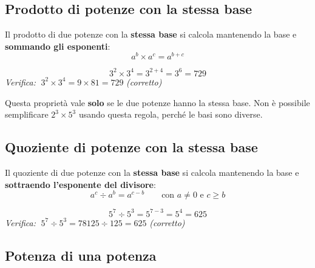 \subsection{Prodotto di potenze con la stessa base}

\begin{regola}
  Il prodotto di due potenze con la \textbf{stessa base} si calcola mantenendo
  la base e \textbf{sommando gli esponenti}:
  \[
    a^b \times a^c = a^{b+c}
  \]
\end{regola}

\begin{esempio}
  \[
    3^2 \times 3^4 = 3^{2+4} = 3^6 = 729
  \]
  \textit{Verifica:} $\;3^2 \times 3^4 = 9 \times 81 = 729$ \quad\textit{(corretto)}
\end{esempio}

\begin{attenzione}
  Questa proprietà vale \textbf{solo} se le due potenze hanno la stessa base.
  Non è possibile semplificare $2^3 \times 5^3$ usando questa regola,
  perché le basi sono diverse.
\end{attenzione}

\subsection{Quoziente di potenze con la stessa base}

\begin{regola}
  Il quoziente di due potenze con la \textbf{stessa base} si calcola mantenendo
  la base e \textbf{sottraendo l'esponente del divisore}:
  \[
    a^c \div a^b = a^{c-b} \qquad \text{con } a \neq 0 \text{ e } c \geq b
  \]
\end{regola}

\begin{esempio}
  \[
    5^7 \div 5^3 = 5^{7-3} = 5^4 = 625
  \]
  \textit{Verifica:} $\;5^7 \div 5^3 = 78125 \div 125 = 625$ \quad\textit{(corretto)}
\end{esempio}

\subsection{Potenza di una potenza}

